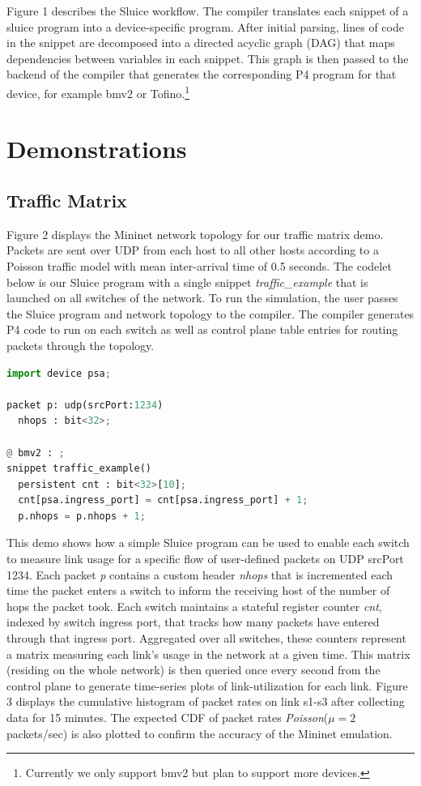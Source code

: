 Figure 1 describes the Sluice workflow. The compiler translates each snippet of
a sluice program into a device-specific program. After initial parsing, lines
of code in the snippet are decomposed into a directed acyclic graph (DAG) that
maps dependencies between variables in each snippet. This graph is then passed
to the backend of the compiler that generates the corresponding P4 program for
that device, for example bmv2 or Tofino.\footnote{Currently we only support
bmv2 but plan to support more devices.} 

\section{Demonstrations}
 
\subsection{Traffic Matrix}

Figure 2 displays the Mininet network topology for our traffic matrix demo.
Packets are sent over UDP from each host to all other hosts according to a
Poisson traffic model with mean inter-arrival time of 0.5 seconds. The codelet
below is our Sluice program with a single snippet \textit{traffic\_example}
that is launched on all switches of the network. To run the simulation, the
user passes the Sluice program and network topology to the compiler. The
compiler generates P4 code to run on each switch as well as control plane table
entries for routing packets through the topology.

\begin{lstlisting}[language=Python, basicstyle=\scriptsize]
import device psa;

packet p: udp(srcPort:1234)
  nhops : bit<32>;

@ bmv2 : ;
snippet traffic_example()
  persistent cnt : bit<32>[10];
  cnt[psa.ingress_port] = cnt[psa.ingress_port] + 1;
  p.nhops = p.nhops + 1;
\end{lstlisting}

This demo shows how a simple Sluice program can be used to enable each switch
to measure link usage for a specific flow of user-defined packets on UDP
srcPort 1234. Each packet \textit{p} contains a custom header \textit{nhops}
that is incremented each time the packet enters a switch to inform the
receiving host of the number of hops the packet took. Each switch maintains a
stateful register counter \textit{cnt}, indexed by switch ingress port, that
tracks how many packets have entered through that ingress port. Aggregated over
all switches, these counters represent a matrix measuring each link's
usage in the network at a given time. This matrix (residing on the whole
network) is then queried once every second from the control plane to generate
time-series plots of link-utilization for each link. Figure 3 displays the cumulative
histogram of packet rates on link s1-s3 after collecting data for 15 minutes.
The expected CDF of packet rates \textit{Poisson}($\mu = 2$
packets/sec) is also plotted to confirm the accuracy of the Mininet emulation.

